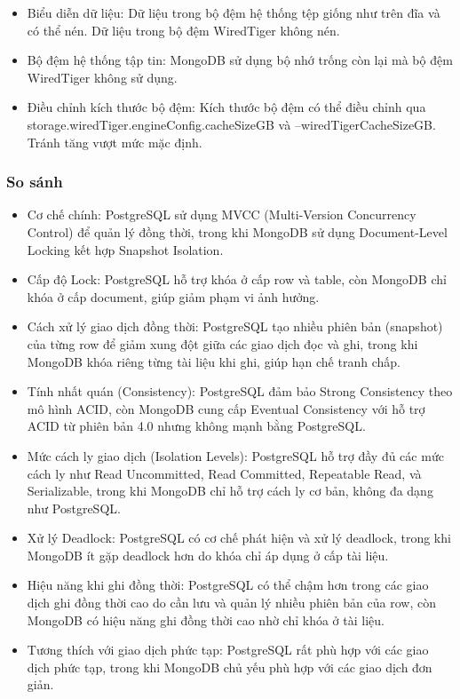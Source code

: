 \begin{enumerate}
\begin{itemize}
        \item Biểu diễn dữ liệu: Dữ liệu trong bộ đệm hệ thống tệp giống như trên đĩa và có thể nén. Dữ liệu trong bộ đệm WiredTiger không nén.
        \item Bộ đệm hệ thống tập tin: MongoDB sử dụng bộ nhớ trống còn lại mà bộ đệm WiredTiger không sử dụng.
        \item Điều chỉnh kích thước bộ đệm: Kích thước bộ đệm có thể điều chỉnh qua storage.wiredTiger.engineConfig.cacheSizeGB và --wiredTigerCacheSizeGB. Tránh tăng vượt mức mặc định.
    \end{itemize}
\end{enumerate}
\subsubsection{So sánh}
\begin{itemize}
    \item Cơ chế chính: PostgreSQL sử dụng MVCC (Multi-Version Concurrency Control) để quản lý đồng thời, trong khi MongoDB sử dụng Document-Level Locking kết hợp Snapshot Isolation.
    \item Cấp độ Lock: PostgreSQL hỗ trợ khóa ở cấp row và table, còn MongoDB chỉ khóa ở cấp document, giúp giảm phạm vi ảnh hưởng.
    \item Cách xử lý giao dịch đồng thời: PostgreSQL tạo nhiều phiên bản (snapshot) của từng row để giảm xung đột giữa các giao dịch đọc và ghi, trong khi MongoDB khóa riêng từng tài liệu khi ghi, giúp hạn chế tranh chấp.
    \item Tính nhất quán (Consistency): PostgreSQL đảm bảo Strong Consistency theo mô hình ACID, còn MongoDB cung cấp Eventual Consistency với hỗ trợ ACID từ phiên bản 4.0 nhưng không mạnh bằng PostgreSQL.
    \item Mức cách ly giao dịch (Isolation Levels): PostgreSQL hỗ trợ đầy đủ các mức cách ly như Read Uncommitted, Read Committed, Repeatable Read, và Serializable, trong khi MongoDB chỉ hỗ trợ cách ly cơ bản, không đa dạng như PostgreSQL.
    \item Xử lý Deadlock: PostgreSQL có cơ chế phát hiện và xử lý deadlock, trong khi MongoDB ít gặp deadlock hơn do khóa chỉ áp dụng ở cấp tài liệu.
    \item Hiệu năng khi ghi đồng thời: PostgreSQL có thể chậm hơn trong các giao dịch ghi đồng thời cao do cần lưu và quản lý nhiều phiên bản của row, còn MongoDB có hiệu năng ghi đồng thời cao nhờ chỉ khóa ở tài liệu.
    \item Tương thích với giao dịch phức tạp: PostgreSQL rất phù hợp với các giao dịch phức tạp, trong khi MongoDB chủ yếu phù hợp với các giao dịch đơn giản.
\end{itemize}
